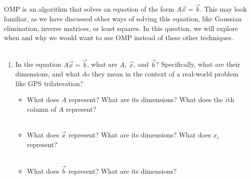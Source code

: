 \\ \\

OMP is an algorithm that solves an equation of the form $A\vec{x} = \vec{b}$.
This may look familiar, as we have discussed other ways of solving this equation,
like Gaussian elimination, inverse matrices, or least squares.
In this question, we will explore when and why we would want to use OMP instead of
these other techniques.
\\ \\

\begin{enumerate}
    \item In the equation $A\vec{x} = \vec{b}$, what are $A$, $\vec{x}$, and $\vec{b}$?
    Specifically, what are their dimensions, and what do they mean in the context of
    a real-world problem like GPS trilateration? 
    \begin{itemize}
        \item What does $A$ represent? What are its dimensions? What does the $i$th column of $A$ represent?
        \answerbox{0.5cm}
        \\ \\

        \item What does $\vec{x}$ represent? What are its dimensions? What does $x_i$ represent?
        \answerbox{0.5cm}
        \\ \\

        \item What does $\vec{b}$ represent? What are its dimensions?
        \answerbox{0.5cm}
        \\ \\
    \end{itemize}


\end{enumerate}
